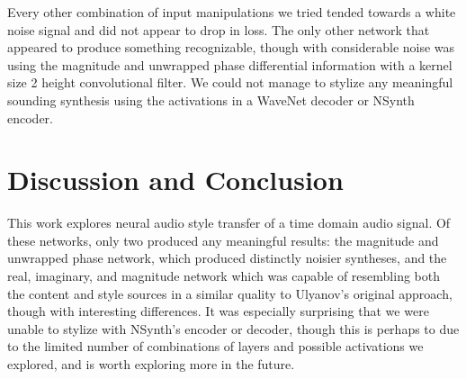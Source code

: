 \documentclass{article}
\begin{document}
Every other combination of input manipulations we tried tended towards a white noise signal and did not appear to drop in loss.  The only other network that appeared to produce something recognizable, though with considerable noise was using the magnitude and unwrapped phase differential information with a kernel size 2 height convolutional filter.  We could not manage to stylize any meaningful sounding synthesis using the activations in a WaveNet decoder or NSynth encoder.


\section{Discussion and Conclusion}

This work explores neural audio style transfer of a time domain audio signal.  Of these networks, only two produced any meaningful results: the magnitude and unwrapped phase network, which produced distinctly noisier syntheses, and the real, imaginary, and magnitude network which was capable of resembling both the content and style sources in a similar quality to Ulyanov's original approach, though with interesting differences.  It was especially surprising that we were unable to stylize with NSynth's encoder or decoder, though this is perhaps to due to the limited number of combinations of layers and possible activations we explored, and is worth exploring more in the future.


\end{document}
